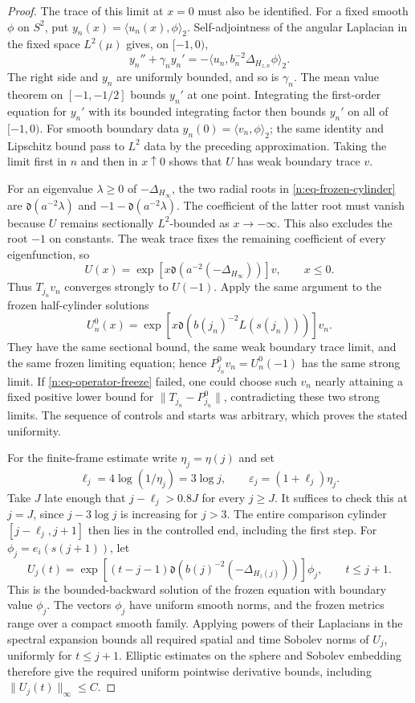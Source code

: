 \begin{proof}
The trace of this limit at \(x=0\) must also be identified.  For a fixed
smooth \(\phi\) on \(S^2\), put \(y_n(x)=\langle u_n(x),\phi\rangle_2\).
Self-adjointness of the angular Laplacian in the fixed space \(L^2(\mu)\)
gives, on \([-1,0)\),
\[
 y_n''+\gamma_n y_n'
 =-\langle u_n,b_n^{-2}\Delta_{H_{z,n}}\phi\rangle_2.
\]
The right side and \(y_n\) are uniformly bounded, and so is \(\gamma_n\).
The mean value theorem on \([-1,-1/2]\) bounds \(y_n'\) at one point.
Integrating the first-order equation for \(y_n'\) with its bounded
integrating factor then bounds \(y_n'\) on all of \([-1,0)\).
For smooth boundary data \(y_n(0)=\langle v_n,\phi\rangle_2\); the same
identity and Lipschitz bound pass to \(L^2\) data by the preceding
approximation.  Taking the limit first in \(n\) and then in \(x\uparrow0\)
shows that \(U\) has weak boundary trace \(v\).

For an eigenvalue \(\lambda\geq0\) of \(-\Delta_{H_\infty}\), the two radial
roots in \eqref{n:eq-frozen-cylinder} are
\(\mathfrak d(a^{-2}\lambda)\) and
\(-1-\mathfrak d(a^{-2}\lambda)\).  The coefficient of the latter root
must vanish because \(U\) remains sectionally \(L^2\)-bounded as
\(x\to-\infty\).  This also excludes the root \(-1\) on constants.
The weak trace fixes the remaining coefficient of every eigenfunction, so
\[
 U(x)=\exp[x\mathfrak d(a^{-2}(-\Delta_{H_\infty}))]v,\qquad x\leq0.
\]
Thus \(T_{j_n}v_n\) converges strongly to \(U(-1)\).
Apply the same argument to the frozen half-cylinder solutions
\[
 U_n^0(x)=\exp[x\mathfrak d(b(j_n)^{-2}L(s(j_n)))]v_n.
\]
They have the same sectional bound, the same weak boundary trace limit, and
the same frozen limiting equation; hence \(P_{j_n}^0v_n=U_n^0(-1)\)
has the same strong limit.  If \eqref{n:eq-operator-freeze} failed, one
could choose such \(v_n\) nearly attaining a fixed positive lower bound for
\(\|T_{j_n}-P_{j_n}^0\|\), contradicting these two strong limits.
The sequence of controls and starts was arbitrary, which proves the stated
uniformity.

For the finite-frame estimate write \(\eta_j=\eta(j)\) and set
\[
 \ell_j=4\log(1/\eta_j)=3\log j,\qquad
 \varepsilon_j=(1+\ell_j)\eta_j.
\]
Take \(J\) late enough that \(j-\ell_j>0.8J\) for every \(j\geq J\).
It suffices to check this at \(j=J\), since \(j-3\log j\) is increasing
for \(j>3\).  The entire comparison cylinder
\([j-\ell_j,j+1]\) then lies in the controlled end, including the first step.
For \(\phi_j=e_i(s(j+1))\), let
\[
 U_j(t)=\exp[(t-j-1)\mathfrak d(b(j)^{-2}(-\Delta_{H_z(j)}))]\phi_j,
 \qquad t\leq j+1.
\]
This is the bounded-backward solution of the frozen equation with boundary
value \(\phi_j\).  The vectors \(\phi_j\) have uniform smooth norms, and
the frozen metrics range over a compact smooth family.  Applying powers of
their Laplacians in the spectral expansion bounds all required spatial and
time Sobolev norms of \(U_j\), uniformly for \(t\leq j+1\).  Elliptic
estimates on the sphere and Sobolev embedding therefore give the required
uniform pointwise derivative bounds, including \(\|U_j(t)\|_\infty\leq C\).


\end{proof}
